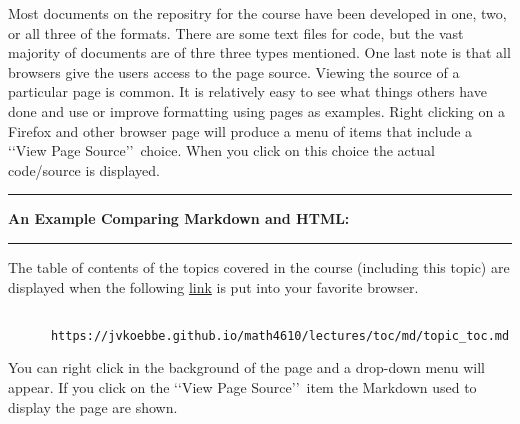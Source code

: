 \documentclass[10pt,fleqn]{article}
\begin{document}
Most documents on the repositry for the course have been developed in one, two,
or all three of the formats. There are some text files for code, but the vast
majority of documents are of thre three types mentioned. One last note is that
all browsers give the users access to the page source. Viewing the source of a 
particular page is common. It is relatively easy to see what things others have
done and use or improve formatting using pages as examples. Right clicking on a
Firefox and other browser page will produce a menu of items that include a
\lq\lq View Page Source\rq\rq\ choice. When you click on this choice the actual
code/source is displayed.
\vskip0.1in\hrule\vskip0.1in \noindent
{\bf An Example Comparing Markdown and HTML:}
\vskip0.1in\hrule\vskip0.1in \noindent
The table of contents of the topics covered in the course (including this topic)
are displayed when the following
\href{https://jvkoebbe.github.io/math4610/lectures/toc/md/topic\_toc.md}{link}
is put into your favorite browser.
\begin{verbatim}

      https://jvkoebbe.github.io/math4610/lectures/toc/md/topic_toc.md

\end{verbatim}
You can right click in the background of the page and a drop-down menu will
appear. If you click on the \lq\lq View Page Source\rq\rq\ item the Markdown
used to display the page are shown. 
\end{document}
